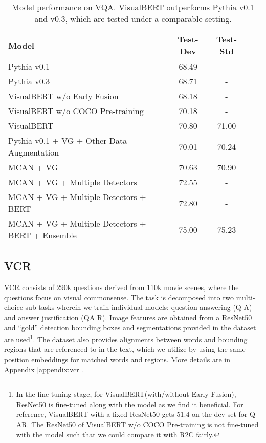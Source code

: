 \documentclass{article} \usepackage{iclr2019_conference,times}
\newcommand{\model}{VisualBERT\xspace}
\newcommand{\modelnp}{VisualBERT w/o COCO Pre-training\xspace}
\newcommand{\modelby}{VisualBERT w/o Early Fusion\xspace}
\newcommand{\modelp}{VisualBERT\xspace}
\begin{document}
\begin{table}[h]
\small
\caption{Model performance on VQA. \model outperforms Pythia v0.1 and v0.3, which are tested under a comparable setting.}
\label{vqa}
\begin{center}
\begin{tabular}{l|cccc}
\toprule

Model & Test-Dev & Test-Std \\ 
\midrule
Pythia v0.1~\citep{jiang2018pythia} & 68.49 & - \\
Pythia v0.3~\citep{singh2019towards} & 68.71 & - \\
\midrule
\modelby & 68.18 & - \\
\modelnp & 70.18 & - \\
\modelp & 70.80 & 71.00\\
\midrule
\midrule
Pythia v0.1 + VG + Other Data Augmentation~\citep{jiang2018pythia} & 70.01 & 70.24\\

MCAN + VG ~\citep{yu2019deep} & 70.63 & 70.90 \\
MCAN + VG + Multiple Detectors~\citep{yu2019deep} & 72.55 & - \\
MCAN + VG + Multiple Detectors + BERT~\citep{yu2019deep} & 72.80 & - \\
MCAN + VG + Multiple Detectors + BERT + Ensemble~\citep{yu2019deep} & 75.00 & 75.23 \\
\bottomrule
\end{tabular}
\end{center}
\end{table}



\subsection{VCR}
\label{vcr_experiment}
VCR consists of 290k questions derived from 110k movie scenes, where the questions focus on visual commonsense. The task is decomposed into two multi-choice sub-tasks wherein we train individual models: question answering (Q  A) and answer justification (QA  R). 
Image features are obtained from a ResNet50~\citep{he2016deep} and ``gold'' detection bounding boxes and segmentations provided in the dataset are used\footnote{In the fine-tuning stage, for \model (with/without Early Fusion), ResNet50 is fine-tuned along with the model as we find it beneficial. For reference, \modelp with a fixed ResNet50 gets 51.4 on the dev set for Q  AR. The ResNet50 of \modelnp is not fine-tuned with the model such that we could compare it with R2C fairly.}. 
The dataset also provides alignments between words and bounding regions that are referenced to in the text, which we utilize by using the same position embeddings for matched words and regions. More details are in Appendix \ref{appendix:vcr}.
\end{document}
